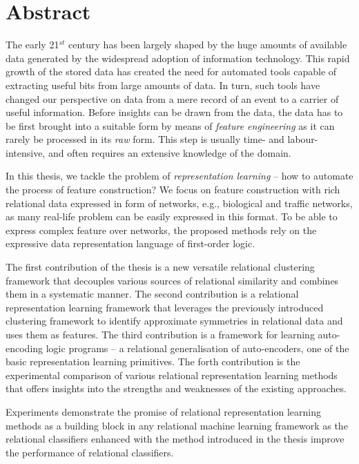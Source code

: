 \chapter{Abstract}                                 \label{ch:abstract}

The early 21$^{st}$ century has been largely shaped by the huge amounts of available data generated by the widespread adoption of information technology.
This rapid growth of the stored data has created the need for automated tools capable of extracting useful bits from large amounts of data.
In turn, such tools have changed our perspective on data from a mere record of an event to a carrier of useful information.
Before insights can be drawn from the data, the data has to be first brought into a suitable form by means of \textit{feature engineering} as it can rarely be processed in its \textit{raw} form.
This step is usually time- and labour-intensive, and often requires an extensive knowledge of the domain.


In this thesis, we tackle the problem of \textit{representation learning} -- how to automate the process of feature construction?
We focus on feature construction with rich relational data expressed in form of networks, e.g., biological and traffic networks, as many real-life problem can be easily expressed in this format.
To be able to express complex feature over networks, the proposed methods rely on the expressive data representation language of first-order logic.


The first contribution of the thesis is a new versatile relational clustering framework that decouples various sources of relational similarity and combines them in a systematic manner.
The second contribution is a relational representation learning framework that leverages the previously introduced clustering framework to identify approximate symmetries in relational data and uses them as features.
The third contribution is a framework for learning auto-encoding logic programs -- a relational generalisation of auto-encoders, one of the basic representation learning primitives.
The forth contribution is the experimental comparison of various relational representation learning methods that offers insights into the strengths and weaknesses of the existing approaches.


Experiments demonstrate the promise of relational representation learning methods as a building block in any relational machine learning framework as the relational classifiers enhanced with the method introduced in the thesis improve the performance of relational classifiers. 



\cleardoublepage

